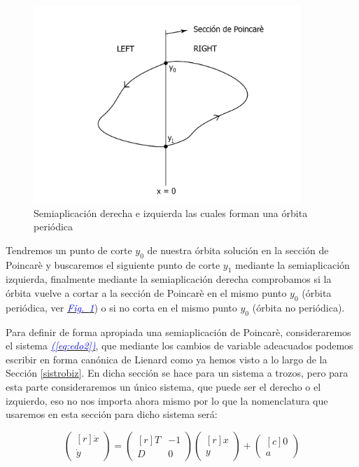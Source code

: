 \documentclass[12pt,a4paper]{report} %
\newcommand{\fref}[1]{\hyperref[#1]{\textcolor{blue}{\textit{Fig.~\ref*{#1}}}}}
\newcommand{\eref}[1]{\hyperref[#1]{\textcolor{blue}{\textit{(\ref*{#1})}}}}
\begin{document}
	\begin{figure}[h]
		\centering
		\includegraphics[width=0.9\textwidth]{poincaLR.jpg}
		\caption{Semiaplicación derecha e izquierda las cuales forman una órbita periódica}
		\label{fig:poincaLR}
	\end{figure}\smallskip
	
	Tendremos un punto de corte $y_0$ de nuestra órbita solución en la sección de Poincarè y buscaremos el siguiente punto de corte $y_1$ mediante la semiaplicación izquierda, finalmente mediante la semiaplicación derecha comprobamos si la órbita vuelve a cortar a la sección de Poincarè en el mismo punto $y_0$ (órbita periódica, ver \fref{fig:poincaLR}) o si no corta en el mismo punto $y_0$ (órbita no periódica).
	
	\vspace{0.5cm}Para definir de forma apropiada una semiaplicación de Poincarè, consideraremos el sistema \eref{eq:edo2}, que mediante los cambios de variable adeacuados podemos escribir en forma canónica de Lienard como ya hemos visto a lo largo de la Sección \ref{sistrobiz}. En dicha sección se hace para un sistema a trozos, pero para esta parte consideraremos un único sistema, que puede ser el derecho o el izquierdo, eso no nos importa ahora mismo por lo que la nomenclatura que usaremos en esta sección para dicho sistema será:
	
		\begin{equation}
		\label{eq:lienardsolo}
		\begin{pmatrix*}[r]
			\dot{x}\\ \dot{y}
		\end{pmatrix*}= \begin{pmatrix*}[r]
			T & -1 \\ D & 0
		\end{pmatrix*} \begin{pmatrix*}[r]
			x \\ y
		\end{pmatrix*}+\begin{pmatrix*}[c]
			0 \\ a
		\end{pmatrix*}
	\end{equation}\smallskip
	\newpage
	
\end{document}
